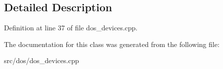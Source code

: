 \subsection{Detailed Description}


Definition at line 37 of file dos\-\_\-devices.\-cpp.



The documentation for this class was generated from the following file\-:\begin{DoxyCompactItemize}
\item 
src/dos/dos\-\_\-devices.\-cpp\end{DoxyCompactItemize}

